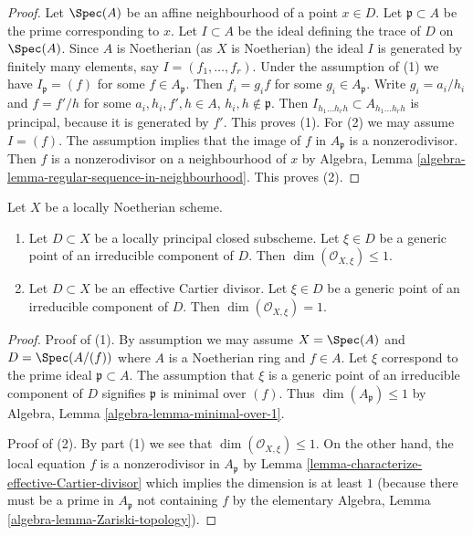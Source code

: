 \begin{proof}
Let $\Spec(A)$ be an affine neighbourhood of a point $x \in D$.
Let $\mathfrak p \subset A$ be the prime corresponding to $x$.
Let $I \subset A$ be the ideal defining the trace of $D$ on
$\Spec(A)$. Since $A$ is Noetherian (as $X$ is Noetherian)
the ideal $I$ is generated by finitely many elements, say
$I = (f_1, \ldots, f_r)$. Under the assumption of (1) we have
$I_\mathfrak p = (f)$ for some $f \in A_\mathfrak p$.
Then $f_i = g_i f$ for some $g_i \in A_\mathfrak p$.
Write $g_i = a_i/h_i$ and $f = f'/h$ for some
$a_i, h_i, f', h \in A$, $h_i, h \not \in \mathfrak p$.
Then $I_{h_1 \ldots h_r h} \subset A_{h_1 \ldots h_r h}$ is
principal, because it is generated by $f'$. This proves (1).
For (2) we may assume $I = (f)$. The assumption implies
that the image of $f$ in $A_\mathfrak p$ is a nonzerodivisor.
Then $f$ is a nonzerodivisor on a neighbourhood of $x$ by
Algebra, Lemma \ref{algebra-lemma-regular-sequence-in-neighbourhood}.
This proves (2).
\end{proof}

\begin{lemma}
\label{lemma-effective-Cartier-codimension-1}
Let $X$ be a locally Noetherian scheme.
\begin{enumerate}
\item Let $D \subset X$ be a locally principal closed subscheme.
Let $\xi \in D$ be a generic point of an irreducible component of $D$.
Then $\dim(\mathcal{O}_{X, \xi}) \leq 1$.
\item Let $D \subset X$ be an effective Cartier divisor.
Let $\xi \in D$ be a generic point of an irreducible component of $D$.
Then $\dim(\mathcal{O}_{X, \xi}) = 1$.
\end{enumerate}
\end{lemma}

\begin{proof}
Proof of (1). By assumption we may assume $X = \Spec(A)$ and
$D = \Spec(A/(f))$ where $A$ is a Noetherian ring and $f \in A$.
Let $\xi$ correspond to the prime ideal $\mathfrak p \subset A$.
The assumption that $\xi$ is a generic point of an irreducible
component of $D$ signifies $\mathfrak p$ is minimal over $(f)$.
Thus $\dim(A_\mathfrak p) \leq 1$ by
Algebra, Lemma \ref{algebra-lemma-minimal-over-1}.

\medskip\noindent
Proof of (2). By part (1) we see that $\dim(\mathcal{O}_{X, \xi}) \leq 1$.
On the other hand, the local equation $f$ is a nonzerodivisor in
$A_\mathfrak p$ by Lemma \ref{lemma-characterize-effective-Cartier-divisor}
which implies the dimension is at least $1$ (because there must be a
prime in $A_\mathfrak p$ not containing $f$ by the elementary
Algebra, Lemma \ref{algebra-lemma-Zariski-topology}).
\end{proof}

